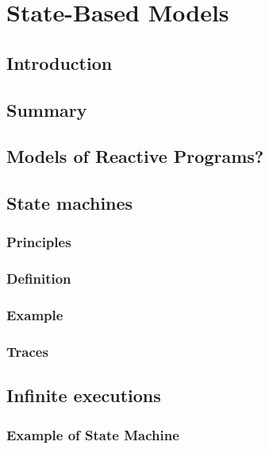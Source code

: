 \documentclass[12pt, a4paper]{book}
\begin{document}
  \section{State-Based Models}
  \label{sec:State-Based Models}
  \subsection{Introduction}
  \label{sub:Introduction}
  \subsection{Summary}
  \label{sub:Summary}
  \subsection{Models of Reactive Programs?}
  \label{sub:Models of Reactive Programs?}
  \subsection{State machines}
  \label{sub:State machines}
  \subsubsection{Principles}
  \label{subs:Principles}
  \subsubsection{Definition}
  \label{subs:Definition}
  \subsubsection{Example}
  \label{subs:Example}
  \subsubsection{Traces}
  \label{subs:Traces}
  \subsection{Infinite executions}
  \label{sub:Infinite executions}
  \subsubsection{Example of State Machine}
  \label{subs:Example of State Machine}
\end{document}
